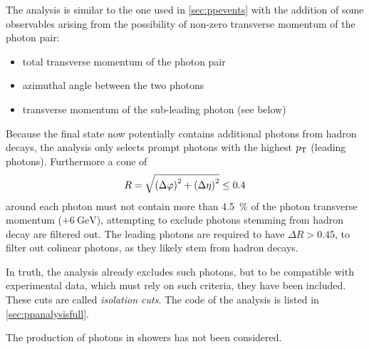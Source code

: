 The analysis is similar to the one used in \cref{sec:ppevents} with
the addition of some observables arising from the possibility of
non-zero transverse momentum of the photon pair:
%
\begin{itemize}
\item total transverse momentum of the photon pair
\item azimuthal angle between the two photons
\item transverse momentum of the sub-leading photon (see below)
\end{itemize}
%
Because the final state now potentially contains additional photons
from hadron decays, the analysis only selects prompt photons with the
highest \(p_\mathrm{T}\) (leading photons). Furthermore a cone of
\[R = \sqrt{\qty(\Delta\varphi)^2 + \qty(\Delta\eta)^2} \leq 0.4\]
around each photon must not contain more than \SI{4.5}{\percent} of
the photon transverse momentum (\(+ \SI{6}{\giga\electronvolt}\)),
attempting to exclude photons stemming from hadron decay are filtered
out. The leading photons are required to have \(\Delta R > 0.45\), to
filter out colinear photons, as they likely stem from hadron
decays.

In truth, the analysis already excludes such photons, but to
be compatible with experimental data, which must rely on such
criteria, they have been included. These cuts are called
\emph{isolation cuts}. The code of the analysis is listed in
\cref{sec:ppanalysisfull}.

The production of photons in showers has not been considered.


